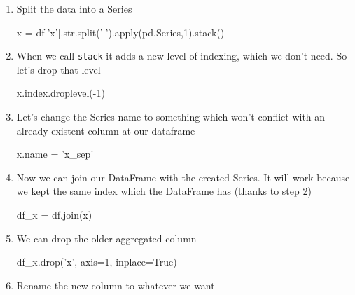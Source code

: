 \documentclass[11pt]{article}
\newenvironment{Shaded}{}{}
\newcommand{\DecValTok}[1]{\textcolor[rgb]{0.25,0.63,0.44}{{#1}}}
\newcommand{\StringTok}[1]{\textcolor[rgb]{0.25,0.44,0.63}{{#1}}}
\newcommand{\NormalTok}[1]{{#1}}
\newcommand{\VariableTok}[1]{\textcolor[rgb]{0.10,0.09,0.49}{{#1}}}
\newcommand{\OperatorTok}[1]{\textcolor[rgb]{0.40,0.40,0.40}{{#1}}}
\newcommand{\BuiltInTok}[1]{{#1}}
\begin{document}
\begin{enumerate}
\def\labelenumi{\arabic{enumi}.}
\item
  Split the data into a Series

\begin{Shaded}
\begin{Highlighting}[]
\NormalTok{    x }\OperatorTok{=}\NormalTok{ df[}\StringTok{'x'}\NormalTok{].}\BuiltInTok{str}\NormalTok{.split(}\StringTok{'|'}\NormalTok{).}\BuiltInTok{apply}\NormalTok{(pd.Series,}\DecValTok{1}\NormalTok{).stack()}
\end{Highlighting}
\end{Shaded}
\item
  When we call \texttt{stack} it adds a new level of indexing, which we
  don't need. So let's drop that level

\begin{Shaded}
\begin{Highlighting}[]
\NormalTok{    x.index.droplevel(}\OperatorTok{-}\DecValTok{1}\NormalTok{)}
\end{Highlighting}
\end{Shaded}
\item
  Let's change the Series name to something which won't conflict with an
  already existent column at our dataframe

\begin{Shaded}
\begin{Highlighting}[]
\NormalTok{    x.name }\OperatorTok{=} \StringTok{'x_sep'}
\end{Highlighting}
\end{Shaded}
\item
  Now we can join our DataFrame with the created Series. It will work
  because we kept the same index which the DataFrame has (thanks to step
  2)

\begin{Shaded}
\begin{Highlighting}[]
\NormalTok{    df_x }\OperatorTok{=}\NormalTok{ df.join(x)}
\end{Highlighting}
\end{Shaded}
\item
  We can drop the older aggregated column

\begin{Shaded}
\begin{Highlighting}[]
\NormalTok{    df_x.drop(}\StringTok{'x'}\NormalTok{, axis}\OperatorTok{=}\DecValTok{1}\NormalTok{, inplace}\OperatorTok{=}\VariableTok{True}\NormalTok{)}
\end{Highlighting}
\end{Shaded}
\item
  Rename the new column to whatever we want


\end{enumerate}
\end{document}
